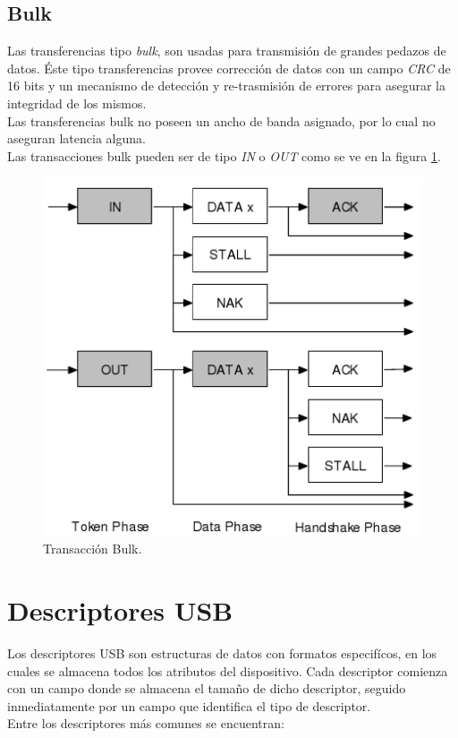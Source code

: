 \subsection{Bulk}
Las transferencias tipo \emph{bulk}, son usadas para transmisi\'on de grandes
pedazos de datos. \'Este tipo transferencias provee correcci\'on de datos
con un campo \emph{CRC} de 16 bits y un mecanismo de detecci\'on y
re-trasmisi\'on de errores para asegurar la integridad de los mismos.\\

Las transferencias bulk no poseen un ancho de banda asignado, por lo cual no
aseguran latencia alguna.\\

Las transacciones bulk pueden ser de tipo \emph{IN} o \emph{OUT} como se ve en
la figura \ref{fig:usb_bulk_transaction}.

\begin{figure}[htp]
\centering
\includegraphics[scale=0.5]{./img/usb_bulk_transaction.png}
\caption{Transacci\'on Bulk.}
\label{fig:usb_bulk_transaction}
\end{figure}


\clearpage
\section{Descriptores USB}
Los descriptores USB son estructuras de datos con formatos especif\'icos, en
los cuales se almacena todos los atributos del dispositivo.
Cada descriptor comienza con un campo donde se almacena el tama\~no de dicho
descriptor, seguido inmediatamente por un campo que identifica el tipo de
descriptor.\\
Entre los descriptores m\'as comunes se encuentran:

